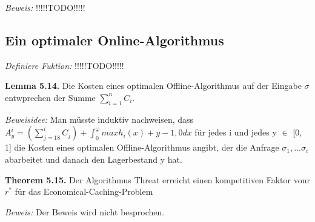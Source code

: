 \textit{Beweis:} !!!!!TODO!!!!!

\subsection{Ein optimaler Online-Algorithmus}

\textit{Definiere Fuktion:} !!!!!TODO!!!!!
 
\textbf{Lemma 5.14.} Die Kosten eines optimalen Offline-Algorithmus auf der Eingabe $\sigma$ entwprechen der Summe $\sum_{i=1}^{n} C_{i}$.

\textit{Beweisidee:} Man müsste induktiv nachweisen, dass $A_{y}^{i} = (\sum_{j=18}^{i} C_{j} ) + \int_{0}^{\varphi} max{h_{i}(x) + y - 1, 0} dx $ für jedes i und jedes y $\in$ [0, 1] die Kosten eines optimalen Offline-Algorithmus angibt, der die Anfrage $\sigma_{1}, ... \sigma_{i}$ abarbeitet und danach den Lagerbestand y hat.

\textbf{Theorem 5.15.} Der Algorithmus Threat erreicht einen kompetitiven Faktor vonr $r^{*}$ für das Economical-Caching-Problem

\textit{Beweis:} Der Beweis wird nicht besprochen.